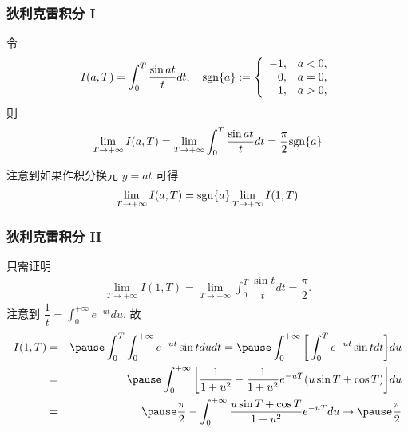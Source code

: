 \begin{frame}%
	\frametitle{狄利克雷积分 I}
	\begin{lem}[狄利克雷积分] 令
		\[I(a,T)=\int_0^T \dfrac{\sin at}{t}dt,\quad{\rm sgn}\{a\}:=\left\{
		\begin{array}{rl}
			-1,& a<0,\\
			0,& a=0,\\
			1,& a>0,
		\end{array}\right.\] 则
		\[\lim_{T\rightarrow+\infty}I(a,T)=\lim_{T\rightarrow+\infty}\int_0^T \dfrac{\sin at}{t}dt=\dfrac{\pi}{2}
		{\rm sgn}\{a\}\]
	\end{lem}

	\zheng 注意到如果作积分换元 $y=at$ 可得
	\begin{eqnarray*}
		\lim_{T\rightarrow+\infty}I(a,T)={\rm sgn}\{a\}\lim_{T\rightarrow+\infty}I(1,T)
	\end{eqnarray*}
\end{frame}
\begin{frame}%
	\frametitle{狄利克雷积分 II}
	只需证明
	\begin{eqnarray*}
		\lim_{T\rightarrow+\infty}I(1,T)=\lim_{T\rightarrow+\infty}\int_0^T\dfrac{\sin t}{t}dt=\dfrac{\pi}{2}.
	\end{eqnarray*}
	注意到 $\dfrac{1}{t}=\int_0^{+\infty} e^{-ut} du$, 故
	\begin{eqnarray*}
		I(1,T)&=&\pause \int_0^T\int_0^{+\infty}e^{-ut}\sin tdu dt=\pause \int_0^{+\infty} \bigg[\int_0^Te^{-ut}\sin tdt\bigg] du\\
		&=&\pause  \int_0^{+\infty}\bigg[\dfrac{1}{1+u^2}-\dfrac{1}{1+u^2}e^{-uT}(u\sin T+\cos T)\bigg]du \\
		&=&\pause \dfrac{\pi}{2}- \int_0^{+\infty}\dfrac{u\sin T+\cos T}{1+u^2}e^{-uT}du\rightarrow \pause \dfrac{\pi}{2}
	\end{eqnarray*}

\end{frame}
